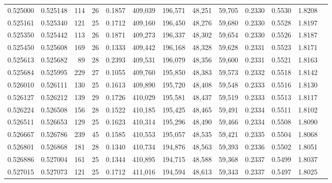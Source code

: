 \begin{tabular}{rrrrrrrrrrrrr}
0.525000 & 0.525148 &    114 &    26 &                                     0.1857 & 409,039 & 196,571 &  48,251 &  59,705 & 0.2330 & 0.5530 & 1.8208 \\
0.525161 & 0.525340 &    121 &    25 &                                     0.1712 & 409,160 & 196,450 &  48,276 &  59,680 & 0.2330 & 0.5528 & 1.8197 \\
0.525350 & 0.525442 &    113 &    26 &                                     0.1871 & 409,273 & 196,337 &  48,302 &  59,654 & 0.2330 & 0.5526 & 1.8187 \\
0.525450 & 0.525608 &    169 &    26 &                                     0.1333 & 409,442 & 196,168 &  48,328 &  59,628 & 0.2331 & 0.5523 & 1.8171 \\
0.525613 & 0.525682 &     89 &    28 &                                     0.2393 & 409,531 & 196,079 &  48,356 &  59,600 & 0.2331 & 0.5521 & 1.8163 \\
0.525684 & 0.525995 &    229 &    27 &                                     0.1055 & 409,760 & 195,850 &  48,383 &  59,573 & 0.2332 & 0.5518 & 1.8142 \\
0.526010 & 0.526111 &    130 &    25 &                                     0.1613 & 409,890 & 195,720 &  48,408 &  59,548 & 0.2333 & 0.5516 & 1.8130 \\
0.526127 & 0.526212 &    139 &    29 &                                     0.1726 & 410,029 & 195,581 &  48,437 &  59,519 & 0.2333 & 0.5513 & 1.8117 \\
0.526224 & 0.526508 &    156 &    28 &                                     0.1522 & 410,185 & 195,425 &  48,465 &  59,491 & 0.2334 & 0.5511 & 1.8102 \\
0.526511 & 0.526653 &    129 &    25 &                                     0.1623 & 410,314 & 195,296 &  48,490 &  59,466 & 0.2334 & 0.5508 & 1.8090 \\
0.526667 & 0.526786 &    239 &    45 &                                     0.1585 & 410,553 & 195,057 &  48,535 &  59,421 & 0.2335 & 0.5504 & 1.8068 \\
0.526801 & 0.526868 &    181 &    28 &                                     0.1340 & 410,734 & 194,876 &  48,563 &  59,393 & 0.2336 & 0.5502 & 1.8051 \\
0.526886 & 0.527004 &    161 &    25 &                                     0.1344 & 410,895 & 194,715 &  48,588 &  59,368 & 0.2337 & 0.5499 & 1.8037 \\
0.527015 & 0.527073 &    121 &    25 &                                     0.1712 & 411,016 & 194,594 &  48,613 &  59,343 & 0.2337 & 0.5497 & 1.8025 \\

\end{tabular}
